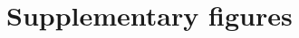 \documentclass[10pt,letterpaper]{article}
\begin{document}
\nolinenumbers

\clearpage




\clearpage
\newpage

\section*{Supplementary figures}

\setcounter{figure}{0}    

\renewcommand{\thefigure}{S\arabic{figure}}
\end{document}
